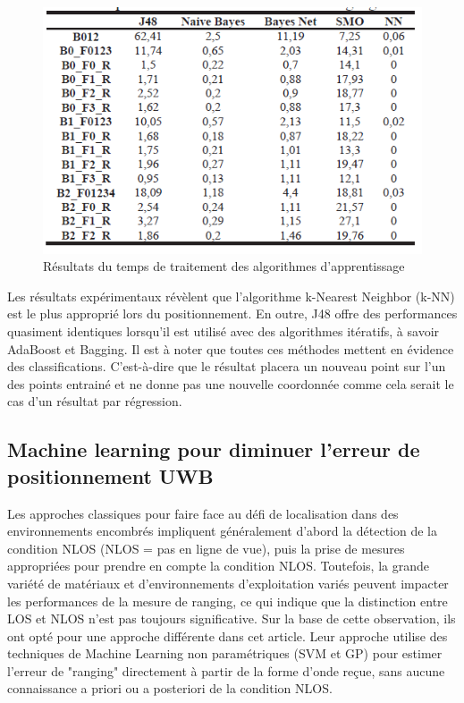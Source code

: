 \begin{figure}[htp]
 \begin{center}
  \includegraphics[scale=1]{figures/time.png}
  \caption{Résultats du temps de traitement des algorithmes d'apprentissage\cite{ML_algo}}
  \label{fig:time} %
 \end{center}
\end{figure}

Les résultats expérimentaux révèlent que l’algorithme k-Nearest Neighbor (k-NN) est le plus approprié lors du positionnement. En outre, J48 offre des performances quasiment identiques lorsqu'il est utilisé avec des algorithmes itératifs, à savoir AdaBoost et Bagging. Il est à noter que toutes ces méthodes mettent en évidence des classifications. C'est-à-dire que le résultat placera un nouveau point sur l'un des points entrainé et ne donne pas une nouvelle coordonnée comme cela serait le cas d'un résultat par régression. 

\subsection{Machine learning pour diminuer l'erreur de positionnement UWB \cite{ML_UWB}}
Les approches classiques pour faire face au défi de localisation dans des environnements encombrés impliquent généralement d'abord la détection de la condition NLOS (NLOS = pas en ligne de vue), puis la prise de mesures appropriées pour prendre en compte la condition NLOS. Toutefois, la grande variété de matériaux et d’environnements d’exploitation variés peuvent impacter les performances de la mesure de ranging, ce qui indique que la distinction entre LOS et NLOS n’est pas toujours significative. Sur la base de cette observation, ils ont opté pour une approche différente dans cet article. Leur approche utilise des techniques de Machine Learning non paramétriques (SVM et GP) pour estimer l’erreur de "ranging" directement à partir de la forme d’onde reçue, sans aucune connaissance a priori ou a posteriori de la condition NLOS. 

